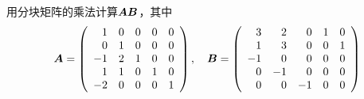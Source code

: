 \begin{frame}


  \begin{li} 
    用分块矩阵的乘法计算$\boldsymbol{A}\boldsymbol{B}$，其中
    $$
    \boldsymbol{A} = \left(
      \begin{array}{rrrrr}
        1&0&0&0&0\\
        0&1&0&0&0\\
        -1&2&1&0&0\\
        1&1&0&1&0\\
        -2&0&0&0&1
      \end{array}
    \right), \quad
    \boldsymbol{B} = \left(
      \begin{array}{rrrrr}
        3&2&0&1&0\\
        1&3&0&0&1\\
        -1&0&0&0&0\\
        0&-1&0&0&0\\
        0&0&-1&0&0
      \end{array}
    \right)
    $$
  \end{li}
\end{frame}

